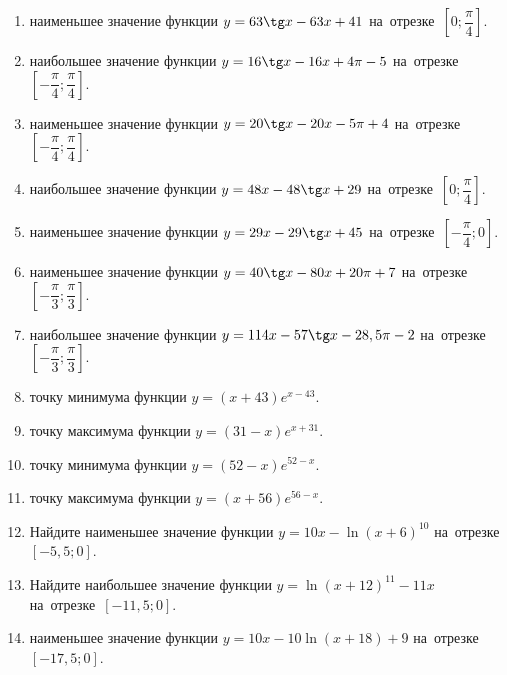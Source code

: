 \documentclass[a4paper,10pt]{article}
\begin{document}
\begin{enumerate}
\item {} наименьшее значение функции $y = 63\tg x-63x+41$ на~отрезке~$\left[0;\dfrac{\pi }{4}\right]$.

\item {} наибольшее значение функции $y=16\tg x-16x+4\pi -5$ на~отрезке~$\left[-\dfrac{\pi }{4};\dfrac{\pi }{4}\right]$.

\item {} наименьшее значение функции $y=20\tg x-20x-5\pi +4$ на~отрезке~$\left[-\dfrac{\pi }{4};\dfrac{\pi }{4}\right]$.

\item {} наибольшее значение функции $y = 48x-48\tg x +29$ на~отрезке~$\left[0;\dfrac{\pi }{4}\right]$.

\item {} наименьшее значение функции $y = 29x-29\tg x +45$ на~отрезке~$\left[-\dfrac{\pi }{4};0\right]$.

\item {} наименьшее значение функции $y = 40\tg x-80x+20 \pi +7$ на~отрезке~$\left[-\dfrac{\pi }{3};\dfrac{\pi }{3}\right]$.

\item {} наибольшее значение функции $y = 114x-57\tg x-28,5\pi -2$ на~отрезке~$\left[-\dfrac{\pi }{3};\dfrac{\pi }{3}\right]$.

\item {} точку минимума функции $y = \left(x+43\right)e^{x-43}$.

\item {} точку максимума функции $y = \left(31-x\right)e^{x+31}$.

\item {} точку минимума функции $y = \left(52-x\right)e^{52-x}$.

\item {} точку максимума функции $y = \left(x+56\right)e^{56-x}$.

\item Найдите наименьшее значение функции $y = 10x-\ln \left(x+6\right)^{10}$ на~отрезке~$\left[-5,5;0\right]$.

\item Найдите наибольшее значение функции $y = \ln \left(x+12\right)^{11}-11x$ на~отрезке~$\left[-11,5;0\right]$.

\item {} наименьшее значение функции $y = 10x-10\ln \left(x+18\right) +9$ на~отрезке~$\left[-17,5;0\right]$.


\end{enumerate}
\end{document}
